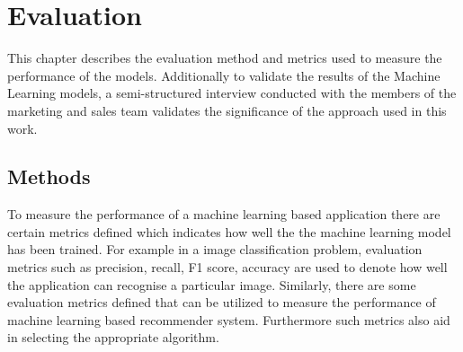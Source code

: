 \chapter{Evaluation} \label{chap:system_archi}
This chapter describes the evaluation method and metrics used to measure the performance of the models. Additionally to validate the results of the Machine Learning models, a semi-structured interview conducted with the members of the marketing and sales team validates the significance of the approach used in this work. 
\section{Methods} \label{sect:thefirst}
To measure the performance of a machine learning based application there are certain metrics defined which indicates how well the the machine learning model has been trained. For example in a image classification problem, evaluation metrics such as precision, recall, F1 score, accuracy are used to denote how well the application can recognise a particular image. Similarly, there are some evaluation metrics defined that can be utilized to measure the performance of machine learning based recommender system. Furthermore such metrics also aid in selecting the appropriate algorithm.  \\ \par


